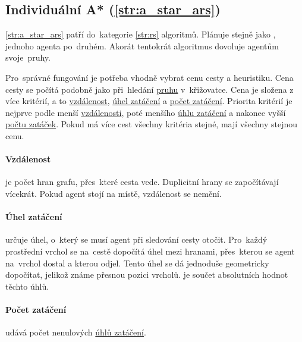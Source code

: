 \subsection{Individuální A* (\ref{str:a_star_ars})}\label{subsec:individualni_a_star}


\ref{str:a_star_ars} patří do~kategorie \ref{str:rs} algoritmů.
Plánuje stejně jako , jednoho agenta po~druhém.
Akorát tentokrát algoritmus dovoluje agentům  svoje~pruhy.

Pro~správné fungování  je potřeba vhodně vybrat cenu cesty a heuristiku.
Cena cesty se počítá podobně jako při~hledání \hyperref[par:pruh]{pruhu} v~křižovatce.
Cena je složena z více kritérií, a to \hyperref[par:ars_vzdalenost]{vzdálenost},
\hyperref[par:ars_uhel_zataceni]{úhel zatáčení} a \hyperref[par:ars_pocet_zataceni]{počet zatáčení}.
Priorita kritérií je nejprve podle menší \hyperref[par:ars_vzdalenost]{vzdálenosti},
poté menšího \hyperref[par:ars_uhel_zataceni]{úhlu zatáčení}
a nakonec vyšší \hyperref[par:ars_pocet_zataceni]{počtu zatáček}.
Pokud má více cest všechny kritéria stejné, mají všechny stejnou cenu.

\paragraph{Vzdálenost}\label{par:ars_vzdalenost} je počet hran grafu, přes~které cesta vede.
Duplicitní hrany se započítávají vícekrát.
Pokud agent stojí na místě, vzdálenost se nemění.

\paragraph{Úhel zatáčení}\label{par:ars_uhel_zataceni} určuje úhel, o~který se musí agent při sledování cesty otočit.
Pro~každý prostřední vrchol se na~cestě dopočítá úhel mezi hranami,
přes~kterou se agent na~vrchol dostal a kterou odjel.
Tento úhel se dá jednoduše geometricky dopočítat, jelikož známe přesnou pozici vrcholů.
 je součet absolutních hodnot těchto úhlů.

\paragraph{Počet zatáčení}\label{par:ars_pocet_zataceni} udává počet
nenulových \hyperref[par:ars_uhel_zataceni]{úhlů zatáčení}.

